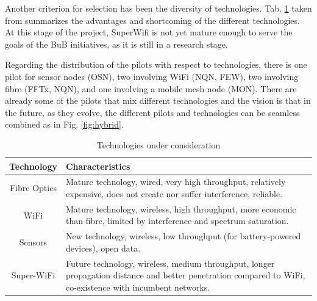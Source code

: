 \documentclass[draftclsnofoot,12pt,journal,onecolumn]{IEEEtran}
\begin{document}
Another criterion for selection has been the diversity of technologies.
Tab. \ref{tab:technologies} taken from \cite{barcelo2012bub} summarizes the advantages and shortcoming of the different technologies.
At this stage of the project, SuperWifi is not yet mature enough to serve the goals of the BuB initiatives, as it is still in a research stage.

Regarding the distribution of the pilots with respect to technologies, there is one pilot for sensor nodes (OSN), two involving WiFi (NQN, FEW), two involving fibre (FFTx, NQN), and one involving a mobile mesh node (MON).
There are already some of the pilots that mix different technologies and the vision is that in the future, as they evolve, the different pilots and technologies can be seamless combined as in Fig. \ref{fig:hybrid}.

\begin{table}[!t]
\renewcommand{\arraystretch}{1.3}
\caption{Technologies under consideration \cite{barcelo2012bub} }
\label{tab:technologies}
\centering
\begin{tabular}{|c|p{5cm}|}
\hline
Technology & Characteristics \\
\hline
Fibre Optics & Mature technology, wired, very high throughput, relatively expensive, does not create nor suffer interference, reliable. \\
WiFi & Mature technology, wireless, high throughput, more economic than fibre, limited by interference and spectrum saturation. \\
Sensors & New technology, wireless, low throughput (for battery-powered devices), open data. \\
Super-WiFi & Future technology, wireless, medium throughput, longer propagation distance and better penetration compared to WiFi, co-existence with incumbent networks.\\
\hline
\end{tabular}
\end{table}
\end{document}
